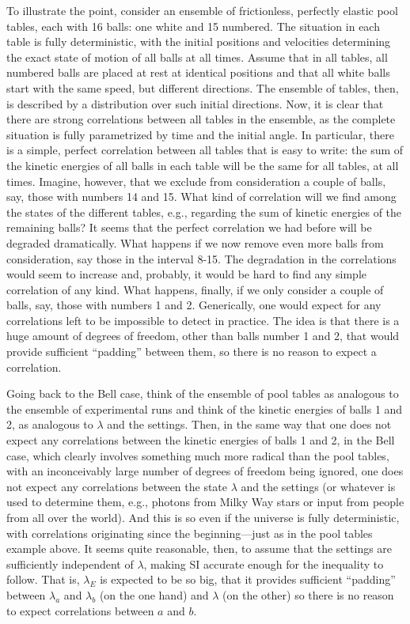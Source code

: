 \documentclass[letterpaper,12pt]{article}
\begin{document}
To illustrate the point, consider an ensemble of frictionless, perfectly elastic pool tables, each with 16 balls: one white and 15 numbered. The situation in each table is fully deterministic, with the initial positions and velocities determining the exact state of motion of all balls at all times. Assume that in all tables, all numbered balls are placed at rest at identical positions and that all white balls start with the same speed, but different directions. The ensemble of tables, then, is described by a distribution over such initial directions. Now, it is clear that there are strong correlations between all tables in the ensemble, as the complete situation is fully parametrized by time and the initial angle. In particular, there is a simple, perfect correlation between all tables that is easy to write: the sum of the kinetic energies of all balls in each table will be the same for all tables, at all times. Imagine, however, that we exclude from consideration a couple of balls, say, those with numbers 14 and 15. What kind of correlation will we find among the states of the different tables, e.g., regarding the sum of kinetic energies of the remaining balls? It seems that the perfect correlation we had before will be degraded dramatically. What happens if we now remove even more balls from consideration, say those in the interval 8-15. The degradation in the correlations would seem to increase and, probably, it would be hard to find any simple correlation of any kind. What happens, finally, if we only consider a couple of balls, say, those with numbers 1 and 2. Generically, one would expect for any correlations left to be impossible to detect in practice. The idea is that there is a huge amount of degrees of freedom, other than balls number 1 and 2, that would provide sufficient ``padding'' between them, so there is no reason to expect a correlation.

Going back to the Bell case, think of the ensemble of pool tables as analogous to the ensemble of experimental runs and think of the kinetic energies of balls 1 and 2, as analogous to $\lambda$ and the settings. Then, in the same way that one does not expect any correlations between the kinetic energies of balls 1 and 2, in the Bell case, which clearly involves something much more radical than the pool tables, with an inconceivably large number of degrees of freedom being ignored, one does not expect any correlations between the state $\lambda$ and the settings (or whatever is used to determine them, e.g., photons from Milky Way stars or input from people from all over the world). And this is so even if the universe is fully deterministic, with correlations originating since the beginning---just as in the pool tables example above. It seems quite reasonable, then, to assume that the settings are sufficiently independent of $\lambda$, making SI accurate enough for the inequality to follow. That is, $\lambda_E$ is expected to be so big, that it provides sufficient ``padding'' between $\lambda_a$ and $\lambda_b$ (on the one hand) and $\lambda$ (on the other) so there is no reason to expect correlations between $a$ and $b$.
\end{document}

